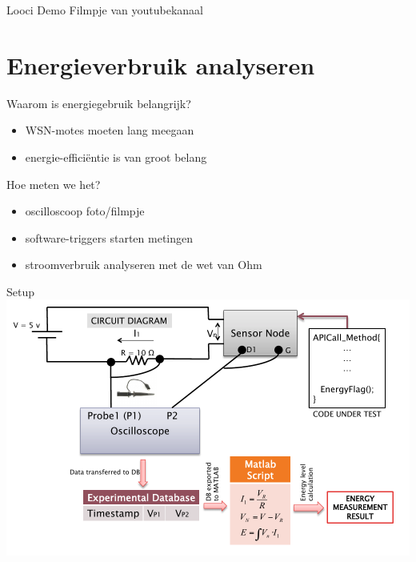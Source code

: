 \documentclass[presentation, bigger]{beamer}
\begin{document}
\begin{frame}[label=sec-2-5]{Looci Demo}
Filmpje van youtubekanaal
\end{frame}

\section{Energieverbruik analyseren}
\label{sec-3}

\begin{frame}[label=sec-3-1]{Waarom is energiegebruik belangrijk?}
\begin{itemize}
\item WSN-motes moeten lang meegaan
\item energie-efficiëntie is van groot belang
\end{itemize}
\end{frame}

\begin{frame}[label=sec-3-2]{Hoe meten we het?}
\begin{itemize}
\item oscilloscoop
foto/filmpje
\item software-triggers starten metingen
\item stroomverbruik analyseren met de wet van Ohm
\end{itemize}
\end{frame}

\begin{frame}[label=sec-3-3]{Setup}
\includegraphics[width=\textwidth,keepaspectration=true]{energy_measurement_diagram}
\end{frame}
\end{document}
